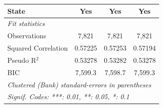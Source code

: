 \begin{tabular}{lccc}
   State                                        & Yes            & Yes            & Yes\\  
   \midrule
   \emph{Fit statistics}\\
   Observations                                 & 7,821          & 7,821          & 7,821\\  
   Squared Correlation                          & 0.57225        & 0.57253        & 0.57194\\  
   Pseudo R$^2$                                 & 0.53278        & 0.53282        & 0.53278\\  
   BIC                                          & 7,599.3        & 7,598.7        & 7,599.3\\  
   \midrule \midrule
   \multicolumn{4}{l}{\emph{Clustered (Bank) standard-errors in parentheses}}\\
   \multicolumn{4}{l}{\emph{Signif. Codes: ***: 0.01, **: 0.05, *: 0.1}}\\
\end{tabular}
\par\endgroup

